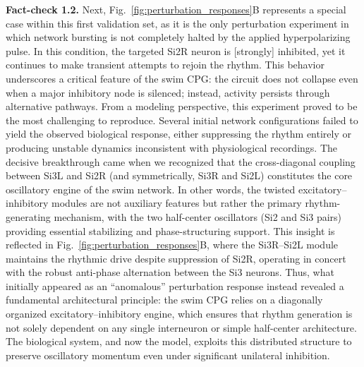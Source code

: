 \documentclass[nofootinbib,aip,amsmath,amssymb,reprint,twocolumn,10pt]{revtex4-2}
\begin{document}

{\bf Fact-check 1.2.} Next, Fig.~\ref{fig:perturbation_responses}B represents a special case within this first validation set, as it is the only perturbation experiment in which network bursting is not completely halted by the applied hyperpolarizing pulse. In this condition, the targeted Si2R neuron is [strongly] inhibited, yet it continues to make transient attempts to rejoin the rhythm. This behavior underscores a critical feature of the swim CPG: the circuit does not collapse even when a major inhibitory node is silenced; instead, activity persists through alternative pathways. From a modeling perspective, this experiment proved to be the most challenging to reproduce. Several initial network configurations failed to yield the observed biological response, either suppressing the rhythm entirely or producing unstable dynamics inconsistent with physiological recordings. The decisive breakthrough came when we recognized that the cross-diagonal coupling between Si3L and Si2R (and symmetrically, Si3R and Si2L) constitutes the core oscillatory engine of the swim network. In other words, the twisted excitatory--inhibitory modules are not auxiliary features but rather the primary rhythm-generating mechanism, with the two half-center oscillators (Si2 and Si3 pairs) providing essential stabilizing and phase-structuring support. This insight is reflected in Fig.~\ref{fig:perturbation_responses}B, where the Si3R--Si2L module maintains the rhythmic drive despite suppression of Si2R, operating in concert with the robust anti-phase alternation between the Si3 neurons. Thus, what initially appeared as an ``anomalous'' perturbation response instead revealed a fundamental architectural principle: the swim CPG relies on a diagonally organized excitatory--inhibitory engine, which ensures that rhythm generation is not solely dependent on any single interneuron or simple half-center architecture. The biological system, and now the model, exploits this distributed structure to preserve oscillatory momentum even under significant unilateral inhibition.    
\end{document}
